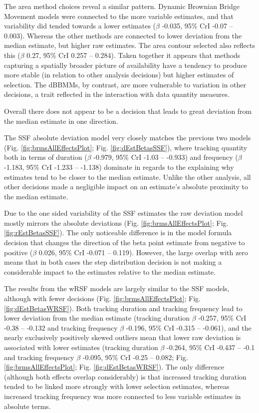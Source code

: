 \documentclass[10pt,a4paper]{article}
\begin{document}
The area method choices reveal a similar pattern.
Dynamic Brownian Bridge Movement models were connected to the more variable estimates, and that variability did tended towards a lower estimates (\(\beta\) -0.035, 95\% CrI -0.07 -- 0.003).
Whereas the other methods are connected to lower deviation from the median estimate, but higher raw estimates.
The area contour selected also reflects this (\(\beta\) 0.27, 95\% CrI 0.257 -- 0.284).
Taken together it appears that methods capturing a spatially broader picture of availability have a tendency to produce more stable (in relation to other analysis decisions) but higher estimates of selection.
The dBBMMs, by contrast, are more vulnerable to variation in other decisions, a trait reflected in the interaction with data quantity measures.

Overall there does not appear to be a decision that leads to great deviation from the median estimate in one direction.

The SSF absolute deviation model very closely matches the previous two models (Fig. \ref{fig:brmsAllEffectsPlot}; Fig. \ref{fig:dEstBetasSSF}), where tracking quantity both in terms of duration (\(\beta\) -0.979, 95\% CrI -1.03 -- -0.933) and frequency (\(\beta\) -1.183, 95\% CrI -1.233 -- -1.138) dominate in regards to the explaining why estimates tend to be closer to the median estimate.
Unlike the other analysis, all other decisions made a negligible impact on an estimate's absolute proximity to the median estimate.

Due to the one sided variability of the SSF estimates the raw deviation model mostly mirrors the absolute deviations (Fig. \ref{fig:brmsAllEffectsPlot}; Fig. \ref{fig:rEstBetasSSF}).
The only noticeable difference is in the model formula decision that changes the direction of the beta point estimate from negative to positive (\(\beta\) 0.026, 95\% CrI -0.071 -- 0.119).
However, the large overlap with zero means that in both cases the step distribution decision is not making a considerable impact to the estimates relative to the median estimate.

The results from the wRSF models are largely similar to the SSF models, although with fewer decisions (Fig. \ref{fig:brmsAllEffectsPlot}; Fig. \ref{fig:dEstBetasWRSF}).
Both tracking duration and tracking frequency lead to lower deviation from the median estimate (tracking duration \(\beta\) -0.257, 95\% CrI -0.38 -- -0.132 and tracking frequency \(\beta\) -0.196, 95\% CrI -0.315 -- -0.061), and the nearly exclusively positively skewed outliers mean that lower raw deviation is associated with lower estimates (tracking duration \(\beta\) -0.264, 95\% CrI -0.437 -- -0.1 and tracking frequency \(\beta\) -0.095, 95\% CrI -0.25 -- 0.082; Fig. \ref{fig:brmsAllEffectsPlot}; Fig. \ref{fig:dEstBetasWRSF}).
The only difference (although both effects overlap considerably) is that increased tracking duration tended to be linked more strongly with lower selection estimates, whereas increased tracking frequency was more connected to less variable estimates in absolute terms.
\end{document}
